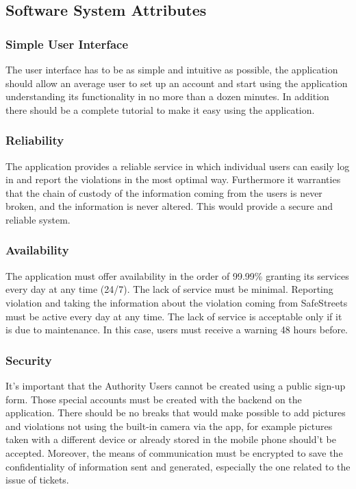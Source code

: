 \subsection{Software System Attributes}
\subsubsection{Simple User Interface}
The user interface has to be as simple and intuitive as possible, the application should allow an average user to set up an account and start using the application understanding its functionality in no more than a dozen minutes. In addition there should be a complete tutorial to make it easy using the application.

\subsubsection{Reliability}
The application provides a reliable service in which individual users can easily log in and report the violations in the most optimal way. Furthermore it warranties that the chain of custody of the information coming from the users is never broken, and the information is never altered. This would provide a secure and reliable system.

\subsubsection{Availability}
The application must offer availability in the order of 99.99\% granting its services every day at any time (24/7). The lack of service must be minimal. Reporting violation and taking the information about the violation coming from SafeStreets must be active every day at any time. The lack of service is acceptable only if it is due to maintenance. In this case, users must receive a warning 48 hours before.

\subsubsection{Security}
It's important that the Authority Users cannot be created using a public sign-up form. Those special accounts must be created with the backend on the application.
There should be no breaks that would make possible to add pictures and violations not using the built-in camera via the app, for example pictures taken with a different device or already stored in the mobile phone should't be accepted. Moreover, the means of communication must be encrypted to save the confidentiality of information sent and generated, especially the one related to the issue of tickets.

